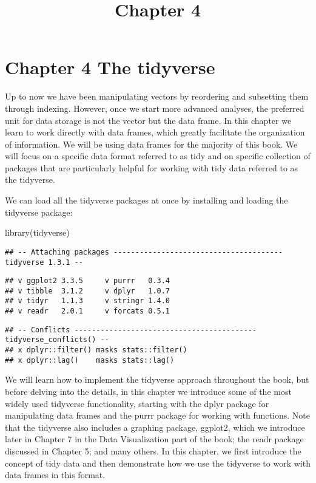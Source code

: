 \documentclass[
]{article}
\title{Chapter 4}
\author{}
\date{\vspace{-2.5em}}
\newenvironment{Shaded}{\begin{snugshade}}{\end{snugshade}}
\newcommand{\FunctionTok}[1]{\textcolor[rgb]{0.00,0.00,0.00}{#1}}
\newcommand{\NormalTok}[1]{#1}
\begin{document}
\maketitle

\hypertarget{chapter-4-the-tidyverse}{%
\section{Chapter 4 The tidyverse}\label{chapter-4-the-tidyverse}}

Up to now we have been manipulating vectors by reordering and subsetting
them through indexing. However, once we start more advanced analyses,
the preferred unit for data storage is not the vector but the data
frame. In this chapter we learn to work directly with data frames, which
greatly facilitate the organization of information. We will be using
data frames for the majority of this book. We will focus on a specific
data format referred to as tidy and on specific collection of packages
that are particularly helpful for working with tidy data referred to as
the tidyverse.

We can load all the tidyverse packages at once by installing and loading
the tidyverse package:

\begin{Shaded}
\begin{Highlighting}[]
\FunctionTok{library}\NormalTok{(tidyverse)}
\end{Highlighting}
\end{Shaded}

\begin{verbatim}
## -- Attaching packages --------------------------------------- tidyverse 1.3.1 --
\end{verbatim}

\begin{verbatim}
## v ggplot2 3.3.5     v purrr   0.3.4
## v tibble  3.1.2     v dplyr   1.0.7
## v tidyr   1.1.3     v stringr 1.4.0
## v readr   2.0.1     v forcats 0.5.1
\end{verbatim}

\begin{verbatim}
## -- Conflicts ------------------------------------------ tidyverse_conflicts() --
## x dplyr::filter() masks stats::filter()
## x dplyr::lag()    masks stats::lag()
\end{verbatim}

We will learn how to implement the tidyverse approach throughout the
book, but before delving into the details, in this chapter we introduce
some of the most widely used tidyverse functionality, starting with the
dplyr package for manipulating data frames and the purrr package for
working with functions. Note that the tidyverse also includes a graphing
package, ggplot2, which we introduce later in Chapter 7 in the Data
Visualization part of the book; the readr package discussed in Chapter
5; and many others. In this chapter, we first introduce the concept of
tidy data and then demonstrate how we use the tidyverse to work with
data frames in this format.
\end{document}
